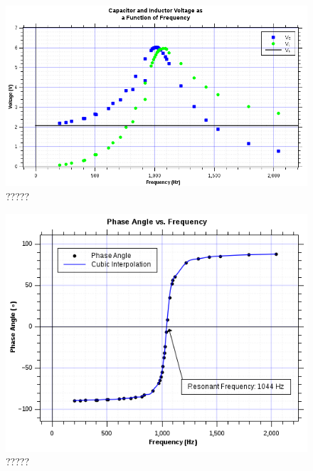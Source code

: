 \documentclass[twocolumn,english]{IEEEtran}
\theoremstyle{plain}
\theoremstyle{plain}
\begin{document}
\begin{figure}[h!]
	\begin{centering}
	\begin{center}
	\includegraphics[width=\linewidth]{./Part6.png}
	\caption{?????}
	\label{fig:??????}
	\end{center}
	\par\end{centering}
\end{figure}
\begin{figure}[h!]
	\begin{centering}
	\begin{center}
	\includegraphics[width=\linewidth]{./Part7.png}
	\caption{?????}
	\label{fig:??????}
	\end{center}
	\par\end{centering}
\end{figure}
\end{document}
